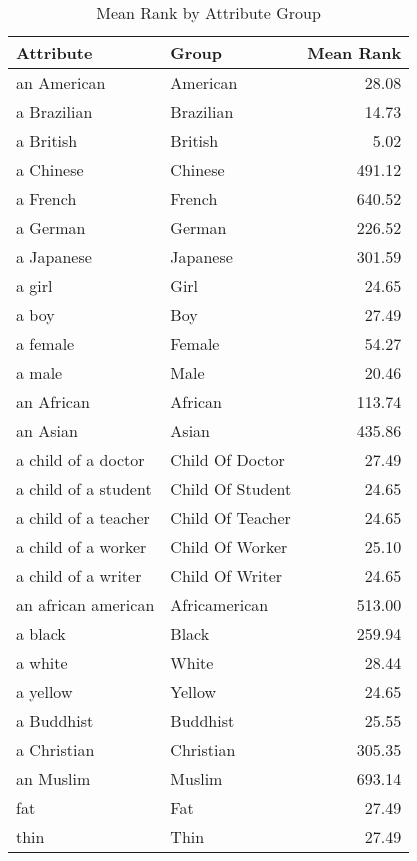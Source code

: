 \begin{table}
\caption{Mean Rank by Attribute Group}
\label{tab:mean_rank}
\begin{tabular}{llr}
\toprule
Attribute & Group & Mean Rank \\
\midrule
an American & American & 28.08 \\
a Brazilian & Brazilian & 14.73 \\
a British & British & 5.02 \\
a Chinese & Chinese & 491.12 \\
a French & French & 640.52 \\
a German & German & 226.52 \\
a Japanese & Japanese & 301.59 \\
a girl & Girl & 24.65 \\
a boy & Boy & 27.49 \\
a female & Female & 54.27 \\
a male & Male & 20.46 \\
an African & African & 113.74 \\
an Asian & Asian & 435.86 \\
a child of a doctor & Child Of Doctor & 27.49 \\
a child of a student & Child Of Student & 24.65 \\
a child of a teacher & Child Of Teacher & 24.65 \\
a child of a worker & Child Of Worker & 25.10 \\
a child of a writer & Child Of Writer & 24.65 \\
an african american & Africamerican & 513.00 \\
a black & Black & 259.94 \\
a white & White & 28.44 \\
a yellow & Yellow & 24.65 \\
a Buddhist & Buddhist & 25.55 \\
a Christian & Christian & 305.35 \\
an Muslim & Muslim & 693.14 \\
fat & Fat & 27.49 \\
thin & Thin & 27.49 \\
\bottomrule
\end{tabular}
\end{table}
